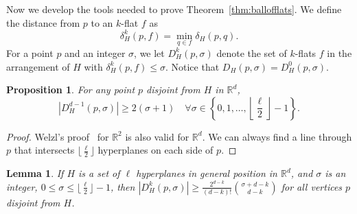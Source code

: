 \documentclass{patmorin}
\newtheorem{theorem}{Theorem}%
\newtheorem{lemma}{Lemma}%
\newtheorem{proposition}{Proposition}[section]
\begin{document}
Now we develop the tools needed to prove Theorem~\ref{thm:ballofflats}. We define the distance from $p$ to an $k$-flat $f$ as
\begin{equation}
  \label{eq:distflat}
  \delta_{H}^{k}(p,f) = \min_{q \in f}\delta_{H}(p,q). \nonumber
\end{equation}
For a point $p$ and an integer $\sigma$, we let $D_{H}^{k}(p,\sigma)$ denote the set of $k$-flats $f$ in the arrangement of $H$ with $\delta_{H}^{k}(p,f) \leq \sigma$. Notice that $D_{H}(p,\sigma) = D_{H}^{0}(p,\sigma)$.

\begin{proposition}
\label{prop:planes}
  For any point $p$ disjoint from $H$ in $\mathbb{R}^{d}$, 
  \[ |D_{H}^{d-1}(p,\sigma)| \geq 2(\sigma+1) \quad \forall \sigma \in \left\{0, 1, \ldots, \left\lfloor \frac{\ell}{2} \right\rfloor - 1\right\}. \]
\end{proposition}

\begin{proof}
  Welzl's proof~\cite{welzl92} for $\mathbb{R}^{2}$ is also valid for $\mathbb{R}^{d}$. We can always find a line through $p$ that intersects $\lfloor \frac{\ell}{2} \rfloor$ hyperplanes on each side of $p$. %
\end{proof}


\begin{lemma}
\label{lem:ballofflats}
  If $H$ is a set of $\ell$ hyperplanes in general position in $\mathbb{R}^{d}$, and $\sigma$ is an integer, $0 \leq \sigma \leq \lfloor \frac{\ell}{2}\rfloor - 1$, then $|D_{H}^{k}(p,\sigma)| \geq \frac{2^{d-k}}{(d-k)!}\binom{\sigma + d-k}{d-k}$ for all vertices $p$ disjoint from $H$.
\end{lemma}
\end{document}
